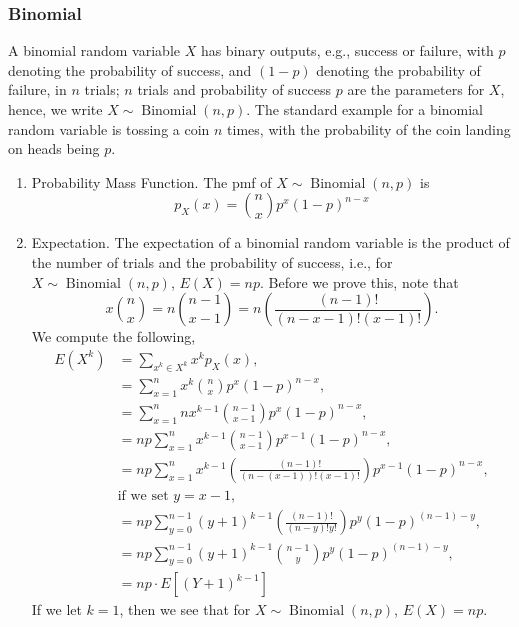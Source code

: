 \documentclass{amsproc}
\DeclareMathOperator{\bin}{\text{Binomial}}
\begin{document}
			\subsubsection{Binomial} A binomial random variable $X$ has binary outputs, e.g., success or failure, with $p$ denoting the probability of success, and $(1-p)$ denoting the probability of failure, in $n$ trials; $n$ trials and probability of success $p$ are the parameters for $X$, hence, we write $X \sim \bin(n,p)$. The standard example for a binomial random variable is tossing a coin $n$ times, with the probability of the coin landing on heads being $p$.
			\begin{enumerate}
				\item Probability Mass Function. The pmf of $X \sim \bin(n,p)$ is \[p_{X}(x) = \binom{n}{x}p^{x}(1-p)^{n-x}\]
				
				\item Expectation. The expectation of a binomial random variable is the product of the number of trials and the probability of success, i.e., for $X \sim \bin(n,p)$, $E(X) = np$. Before we prove this, note that $$x\binom{n}{x} = n\binom{n-1}{x-1} = n\left( \frac{(n-1)!}{(n-x-1)!(x-1)!} \right).$$ We compute the following,
					\begin{align*}
						E(X^{k}) &= \sum\limits_{x^{k} \in X^{k}} x^{k} p_{X}(x), \\
						&= \sum\limits_{x = 1}^{n} x^{k} \binom{n}{x} p^{x}(1-p)^{n-x}, \\
						&= \sum\limits_{x = 1}^{n} nx^{k-1}\binom{n-1}{x-1} p^{x}(1-p)^{n-x}, \\
						&= np \sum\limits_{x = 1}^{n} x^{k-1} \binom{n-1}{x-1} p^{x-1}(1-p)^{n-x}, \\
						&= np \sum\limits_{x = 1}^{n} x^{k-1} \left(\frac{(n-1)!}{\left(n-(x-1)\right)!(x-1)!}\right) p^{x-1}(1-p)^{n-x}, \\
						& \text{if we set $y = x -1$,} \\
						&= np \sum\limits_{y = 0}^{n-1} (y + 1)^{k-1} \left( \frac{(n-1)!}{(n-y)!y!} \right) p^{y}(1-p)^{(n-1)-y}, \\
						&= np \sum\limits_{y = 0}^{n-1} (y + 1)^{k-1} \binom{n-1}{y} p^{y}(1-p)^{(n-1)-y}, \\
						&= np \cdot E\left[ (Y+1)^{k-1} \right]
					\end{align*}
				If we let $k=1$, then we see that for $X \sim \bin(n,p)$, $E(X) = np$.
				

\end{enumerate}
\end{document}
